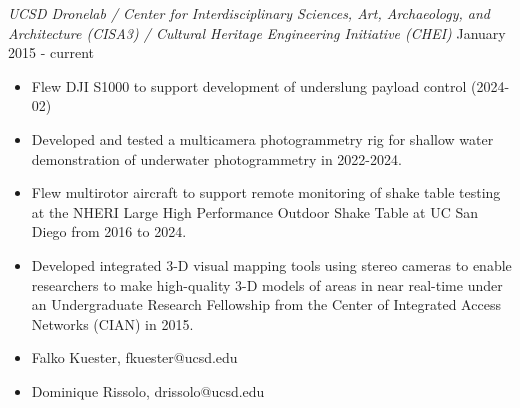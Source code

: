 \documentclass[line,margin]{res}
\begin{document}
\begin{resume}
	{\sl UCSD Dronelab / Center for Interdisciplinary Sciences, Art, Archaeology, and Architecture (CISA3) / Cultural Heritage Engineering Initiative (CHEI)} \hfill January 2015 - current
	\begin{itemize}
		\item Flew DJI S1000 to support development of underslung payload control (2024-02)
		\item Developed and tested a multicamera photogrammetry rig for shallow water demonstration of underwater photogrammetry in 2022-2024.
		\item Flew multirotor aircraft to support remote monitoring of shake table testing at the NHERI Large High Performance Outdoor Shake Table at UC San Diego from 2016 to 2024.
		\item Developed integrated 3-D visual mapping tools using stereo cameras to enable researchers to make high-quality 3-D models of areas in near real-time under an Undergraduate Research Fellowship from the Center of Integrated Access Networks (CIAN) in 2015.
		\item Falko Kuester, fkuester@ucsd.edu
		\item Dominique Rissolo, drissolo@ucsd.edu
	\end{itemize}


\end{resume}
\end{document}
